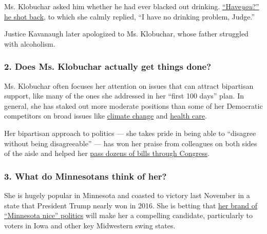 Ms. Klobuchar asked him whether he had ever blacked out drinking.
\href{https://www.youtube.com/watch?v=qsVtXJtl7lw}{``Have}\emph{\href{https://www.youtube.com/watch?v=qsVtXJtl7lw}{you}}\href{https://www.youtube.com/watch?v=qsVtXJtl7lw}{?''
he shot back}, to which she calmly replied, ``I have no drinking
problem, Judge.''

Justice Kavanaugh later apologized to Ms. Klobuchar, whose father
struggled with alcoholism.

\hypertarget{2-does-ms-klobuchar-actually-get-things-done}{%
\subsubsection{\texorpdfstring{\textbf{2. Does Ms. Klobuchar actually
get things
done?}}{2. Does Ms. Klobuchar actually get things done?}}\label{2-does-ms-klobuchar-actually-get-things-done}}

Ms. Klobuchar often focuses her attention on issues that can attract
bipartisan support, like many of the ones she addressed in her ``first
100 days'' plan. In general, she has staked out more moderate positions
than some of her Democratic competitors on broad issues like
\href{https://www.nytimes.com/live/2019/democrats-climate-town-hall/amy-klobuchar-climate-change}{climate
change} and
\href{https://www.nytimes.com/interactive/2019/us/politics/amy-klobuchar-2020-campaign.html}{health
care}.

Her bipartisan approach to politics --- she takes pride in being able to
``disagree without being disagreeable'' --- has won her praise from
colleagues on both sides of the aisle and helped her
\href{https://medium.com/@AmyforAmerica/senator-amy-klobuchar-passed-over-100-bills-as-lead-democrat-29327297d2c}{pass
dozens of bills through Congress}.

\hypertarget{3-what-do-minnesotans-think-of-her}{%
\subsubsection{\texorpdfstring{\textbf{3. What do Minnesotans think of
her?}}{3. What do Minnesotans think of her?}}\label{3-what-do-minnesotans-think-of-her}}

She is hugely popular in Minnesota and coasted to victory last November
in a state that President Trump nearly won in 2016. She is betting that
\href{https://www.nytimes.com/2018/11/26/us/politics/amy-klobuchar-2020-election.html}{her
brand of ``Minnesota nice'' politics} will make her a compelling
candidate, particularly to voters in Iowa and other key Midwestern swing
states.

